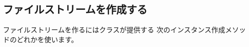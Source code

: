 \documentclass[a4paper,10pt,twoside]{book}
\begin{document}
\subsection{ファイルストリームを作成する}


ファイルストリームを作るにはクラスが提供する
次のインスタンス作成メソッドのどれかを使います。
\end{document}
